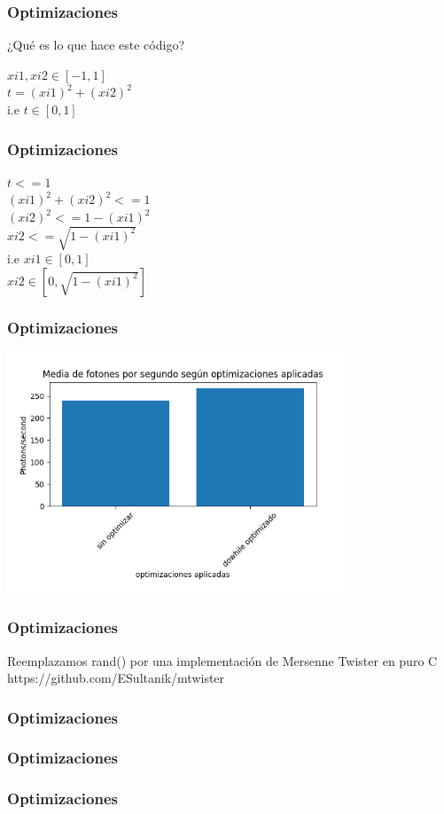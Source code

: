\documentclass{beamer}
\begin{document}
\begin{frame}
    \frametitle{Optimizaciones}
    ¿Qué es lo que hace este código? \\ \pause
    \begin{center}
        $xi1, xi2  \in [-1, 1] $ \\ \pause
        $t = (xi1)^2 + (xi2)^2$ \\ \pause
        i.e $ t \in [0,1]$
    
    \end{center}

\end{frame}


\begin{frame}
    \frametitle{Optimizaciones}
    \begin{center}
        $ t <= 1 $ \\\pause
        $(xi1)^2 + (xi2)^2 <= 1$ \\\pause
        $(xi2)^2 <= 1 - (xi1)^2$ \\\pause
        $xi2 <= \sqrt{1 - (xi1)^2}$\\\pause
        i.e $xi1 \in [0, 1]$\\
        $xi2 \in [0, \sqrt{1 - (xi1)^2}]$    

    \end{center}

\end{frame}

\begin{frame}
    \frametitle{Optimizaciones}

    \includegraphics[width=4in]{imagenes/optimizaciones_1.png}
\end{frame}

\begin{frame}
    \frametitle{Optimizaciones}
        Reemplazamos rand() por una implementación de Mersenne Twister en puro C\\\pause
        https://github.com/ESultanik/mtwister
\end{frame}

\begin{frame}
    \frametitle{Optimizaciones}
    
\end{frame}

\begin{frame}
    \frametitle{Optimizaciones}

\end{frame}

\begin{frame}
    \frametitle{Optimizaciones}

\end{frame}
\end{document}
